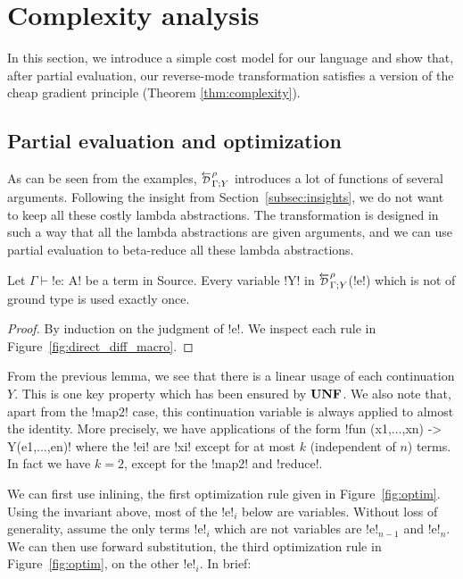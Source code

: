 \section{Complexity analysis}
\label{sec:complexity}

In this section, we introduce a simple cost model for our language and show 
that, after partial evaluation, our reverse-mode transformation satisfies a version of the cheap gradient principle (Theorem \ref{thm:complexity}).

\subsection{Partial evaluation and optimization} %
\label{sub:Partial evaluation and optimization}

As can be seen from the examples, $\directD{\rho}{\Gamma}{Y}$ introduces a lot of functions of several arguments.
Following the insight from Section~\ref{subsec:insights}, we do not want to keep all these costly lambda abstractions.
The transformation is designed in such a way that all the lambda abstractions are given arguments,  
and we can use partial evaluation to beta-reduce all these lambda abstractions.

\begin{lemma}
    Let $\Gamma \vdash$!e: A! be a term in Source. 
    Every variable !Y! in $\directD{\rho}{\Gamma}{Y}$(!e!) which is not of ground type is used exactly once.
\end{lemma}

\begin{proof}
    By induction on the judgment of !e!. We inspect each rule in Figure~\ref{fig:direct_diff_macro}.
\end{proof}

From the previous lemma, we see that there is a linear usage of  each continuation $Y$. 
This is one key property which has been ensured by $\mathbf{UNF}$.
We also note that, apart from the !map2! case, this continuation variable is always applied to almost the identity. 
More precisely, we have applications of the form !fun (x1,$\ldots$,xn) -> Y(e1,$\ldots$,en)! 
where the !ei! are !xi! except for at most $k$ (independent of $n$) terms.
In fact we have $k=2$, except for the !map2! and !reduce!.

We can first use inlining, the first optimization rule given in Figure~\ref{fig:optim}.
Using the invariant above, most of the !e!$_{i}$ below are variables. 
Without loss of generality, assume the only terms !e!$_{i}$ which are not variables are !e!$_{n-1}$ and !e!$_{n}$.
We can then use forward substitution, the third optimization rule in Figure~\ref{fig:optim}, on the other !e!$_{i}$.
In brief:

